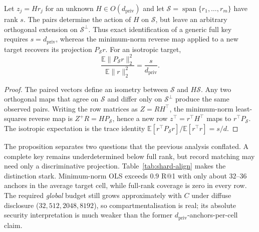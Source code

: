 \begin{proposition}\label{prop:anchor}
Let $z_j=H r_j$ for an unknown $H\in O(d_{\mathrm{priv}})$ and let
$\mathcal S=\operatorname{span}\{r_1,\ldots,r_m\}$ have rank $s$. The pairs
determine the action of $H$ on $\mathcal S$, but leave an arbitrary
orthogonal extension on $\mathcal S^\perp$. Thus exact identification of a
generic full key requires $s=d_{\mathrm{priv}}$, whereas the minimum-norm
reverse map applied to a new target recovers its projection
$P_{\mathcal S}r$. For an isotropic target,
\[
 \frac{\mathbb E\lVert P_{\mathcal S}r\rVert_2^2}
      {\mathbb E\lVert r\rVert_2^2}=\frac{s}{d_{\mathrm{priv}}}.
\]
\end{proposition}
\begin{proof}
The paired vectors define an isometry between $\mathcal S$ and
$H\mathcal S$. Any two orthogonal maps that agree on $\mathcal S$ and differ
only on $\mathcal S^\perp$ produce the same observed pairs. Writing the row
matrices as $Z=R H^\top$, the minimum-norm least-squares reverse map is
$Z^+R=H P_{\mathcal S}$, hence a new row $z^\top=r^\top H^\top$ maps to
$r^\top P_{\mathcal S}$. The isotropic expectation is the trace identity
$\mathbb E[r^\top P_{\mathcal S}r]/\mathbb E[r^\top r]=s/d$.
\end{proof}

The proposition separates two questions that the previous analysis
conflated. A complete key remains underdetermined below full rank, but record
matching may need only a discriminative projection.
Table~\ref{tab:shard-align} makes the distinction stark. Minimum-norm OLS
exceeds $0.9$ R@1 with only about $32$--$36$ anchors in the average target
cell, while full-rank coverage is zero in every row. The required
\emph{global} budget still grows approximately with $C$ under diffuse
disclosure ($32,512,2048,8192$), so compartmentalisation is real; its
absolute security interpretation is much weaker than the former
$d_{\mathrm{priv}}$-anchors-per-cell claim.

